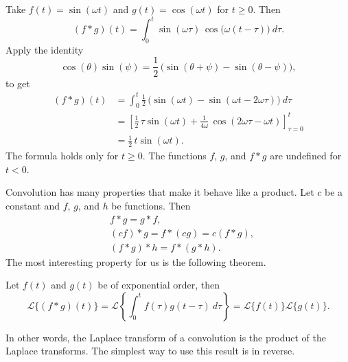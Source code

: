 \documentclass{ximera}
\begin{document}
\begin{example} \label{ltc:convsincosex}
    Take $f(t) = \sin (\omega t)$ and $g(t) = \cos (\omega t)$ for $t \geq 0$. Then 
    \begin{equation*}
        (f*g)(t) = \int_0^t  \sin ( \omega \tau ) \, \cos \bigl( \omega (t-\tau) \bigr) ~ d\tau .
    \end{equation*}
    Apply the identity
    \begin{equation*}
        \cos (\theta) \sin (\psi) = \frac{1}{2} \, \bigl( \sin (\theta + \psi) - \sin (\theta - \psi) \bigr) ,
    \end{equation*}
    to get
    \begin{equation*}
        \begin{split}
            (f*g)(t)
            & = \int_0^t \frac{1}{2} \, \bigl( \sin (\omega t) - \sin (\omega t - 2 \omega \tau ) \bigr) ~ d\tau \\
            & = \left[ \frac{1}{2} \, \tau  \sin (\omega t) + \frac{1}{4\omega} \, \cos (2 \omega \tau - \omega t) \right]_{\tau=0}^t \\
            & = \frac{1}{2} \, t \sin (\omega t) .
        \end{split}
    \end{equation*}
    The formula holds only for $t \geq 0$.  The functions $f$, $g$, and $f*g$ are undefined for $t < 0$.
\end{example}

Convolution has many properties that make it behave like a product. Let $c$ be a constant and $f$, $g$, and $h$ be functions.  Then
\begin{align*}
    & f * g = g * f , \\
    & (c f) * g = f * (c g) = c (f*g) , \\
    & ( f * g ) * h = f * ( g * h ) .
\end{align*}
The most interesting property for us is the following theorem.

\begin{theorem}{}
    Let $f(t)$ and $g(t)$ be of exponential order, then
    \begin{equation*}
        \mathcal{L} \bigl\{ (f*g)(t) \bigr\}
        = \mathcal{L} \left\{ \int_0^t f(\tau) g(t-\tau) ~ d\tau \right\}
        = \mathcal{L} \bigl\{ f(t) \bigr\} \mathcal{L} \bigl\{ g(t) \bigr\} .
    \end{equation*}
\end{theorem}

In other words, the Laplace transform of a convolution is the product of the Laplace transforms.  The simplest way to use this result is in reverse.
\end{document}
